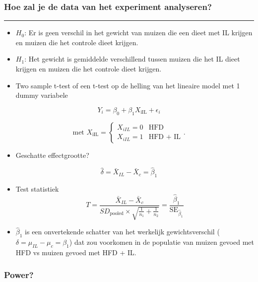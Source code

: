 \documentclass[
]{article}
\providecommand{\tightlist}{%
  \setlength{\itemsep}{0pt}\setlength{\parskip}{0pt}}
\begin{document}
\hypertarget{hoe-zal-je-de-data-van-het-experiment-analyseren}{%
\subsubsection{Hoe zal je de data van het experiment
analyseren?}\label{hoe-zal-je-de-data-van-het-experiment-analyseren}}

\begin{center}\rule{0.5\linewidth}{0.5pt}\end{center}

\begin{itemize}
\item
  \(H_0\): Er is geen verschil in het gewicht van muizen die een dieet
  met IL krijgen en muizen die het controle dieet krijgen.
\item
  \(H_1\): Het gewicht is gemiddelde verschillend tussen muizen die het
  IL dieet krijgen en muizen die het controle dieet krijgen.
\item
  Two sample t-test of een t-test op de helling van het lineaire model
  met 1 dummy variabele
\end{itemize}

\[ Y_i = \beta_0 + \beta_1 X_\text{iIL} + \epsilon_i\]

\[
\text{met }
X_\text{iIL}=\begin{cases}X_{iIL}=0 & \text{HFD}\\X_{iIL}=1 & \text{HFD + IL}\end{cases}.
\]

\begin{itemize}
\tightlist
\item
  Geschatte effectgrootte?
\end{itemize}

\[\hat\delta = \bar X_{IL} - \bar X_{c} = \hat \beta_1\]

\begin{itemize}
\tightlist
\item
  Test statistiek \[
  T = \frac{\bar{X}_{IL}-\bar{X}_{c}}{SD_\text{pooled} \times \sqrt{\frac{1}{n_1} + \frac{1}{n_2}}} = \frac{\hat\beta_1}{\text{SE}_{\hat\beta_1}}
  \]
\item
  \(\hat \beta_1\) is een onvertekende schatter van het werkelijk
  gewichtsverschil (\(\delta =\mu_{IL}-\mu_{c} = \beta_1\)) dat zou
  voorkomen in de populatie van muizen gevoed met HFD vs muizen gevoed
  met HFD + IL.
\end{itemize}

\hypertarget{power}{%
\subsubsection{Power?}\label{power}}
\end{document}
